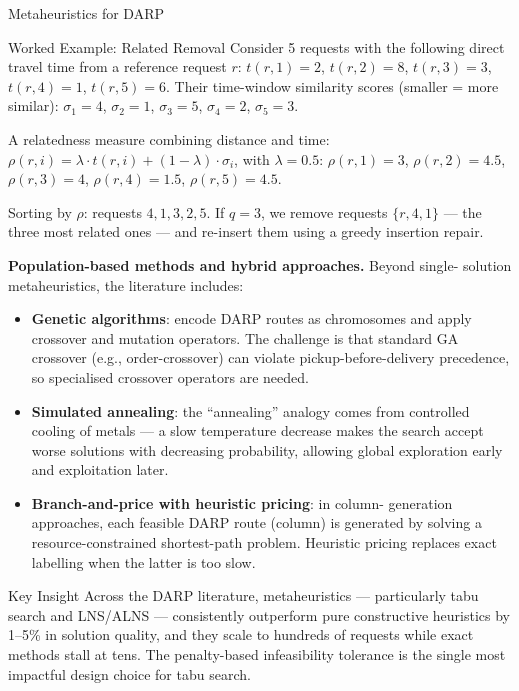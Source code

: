 \documentclass[aspectratio=169,10pt]{beamer}
\begin{document}
\begin{frame}[allowframebreaks]{Metaheuristics for DARP}
  \framebreak

  \begin{exampleblock}{Worked Example: Related Removal}
    Consider 5 requests with the following direct travel time from a
    reference request $r$:
    $t(r,1)=2$, $t(r,2)=8$, $t(r,3)=3$, $t(r,4)=1$, $t(r,5)=6$.
    Their time-window similarity scores (smaller = more similar):
    $\sigma_1=4$, $\sigma_2=1$, $\sigma_3=5$, $\sigma_4=2$, $\sigma_5=3$.

    A relatedness measure combining distance and time:
    $\rho(r,i) = \lambda \cdot t(r,i) + (1-\lambda) \cdot \sigma_i$, with
    $\lambda=0.5$:
    $\rho(r,1)=3$, $\rho(r,2)=4.5$, $\rho(r,3)=4$, $\rho(r,4)=1.5$,
    $\rho(r,5)=4.5$.

    Sorting by $\rho$: requests $4, 1, 3, 2, 5$.
    If $q=3$, we remove requests $\{r, 4, 1\}$ — the three most related ones
    — and re-insert them using a greedy insertion repair.
  \end{exampleblock}

  \framebreak

  \textbf{Population-based methods and hybrid approaches.}  Beyond single-
  solution metaheuristics, the literature includes:
  \begin{itemize}
    \item \textbf{Genetic algorithms}: encode DARP routes as chromosomes
          and apply crossover and mutation operators.  The challenge is that
          standard GA crossover (e.g., order-crossover) can violate
          pickup-before-delivery precedence, so specialised crossover operators
          are needed.
    \item \textbf{Simulated annealing}: the ``annealing'' analogy comes from
          controlled cooling of metals — a slow temperature decrease makes
          the search accept worse solutions with decreasing probability,
          allowing global exploration early and exploitation later.
    \item \textbf{Branch-and-price with heuristic pricing}: in column-
          generation approaches, each feasible DARP route (column) is
          generated by solving a resource-constrained shortest-path problem.
          Heuristic pricing replaces exact labelling when the latter is too
          slow.
  \end{itemize}

  \begin{alertblock}{Key Insight}
    Across the DARP literature, metaheuristics — particularly tabu search
    and LNS/ALNS — consistently outperform pure constructive heuristics
    by 1--5\% in solution quality, and they scale to hundreds of requests
    while exact methods stall at tens.  The penalty-based infeasibility
    tolerance is the single most impactful design choice for tabu search.
  \end{alertblock}

\end{frame}
\end{document}
